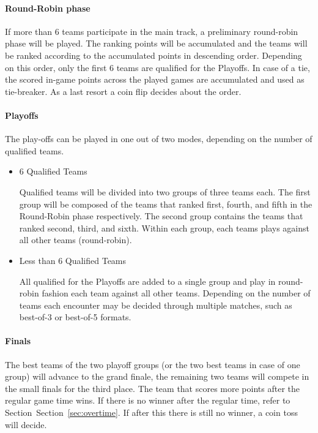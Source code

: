 \documentclass[12pt,twoside]{article}
\newcommand{\refsec}[1]{Section~\ref{#1}}
\begin{document}
\paragraph{Round-Robin phase}
If more than 6 teams participate in the main track, a preliminary round-robin
phase will be played.
The ranking points will be accumulated and the teams will be ranked
according to the accumulated points in descending order.
Depending on this order, only the first 6 teams are qualified for the Playoffs.
In case of a tie, the scored in-game points across the played games are
accumulated and used as tie-breaker.
As a last resort a coin flip decides about the order.

\paragraph{Playoffs}
The play-offs can be played in one out of two modes, depending on the number of
qualified teams.
\begin{itemize}
  \item 6 Qualified Teams

Qualified teams will be divided into two groups of three teams each. The first
group will be composed of the teams that ranked first, fourth, and fifth in the
Round-Robin phase respectively. The second group contains the teams that ranked
second, third, and sixth. Within each group, each teams plays against all other
teams (round-robin).

\item Less than 6 Qualified Teams

All qualified for the Playoffs are added to a single group and play in
round-robin fashion each team against all other teams.
Depending on the number of teams each encounter may be decided through multiple
matches, such as best-of-3 or best-of-5 formats.
\end{itemize}

\paragraph{Finals}
The best teams of the two playoff groups (or the two best teams in case of one
group) will advance to the grand finale, the remaining two teams will compete in
the small finals for the third place. The team that scores more points after the
regular game time wins. If there is no winner after the regular time, refer to
Section~\refsec{sec:overtime}. If after this there is still no winner, a coin
toss will decide.
\end{document}
